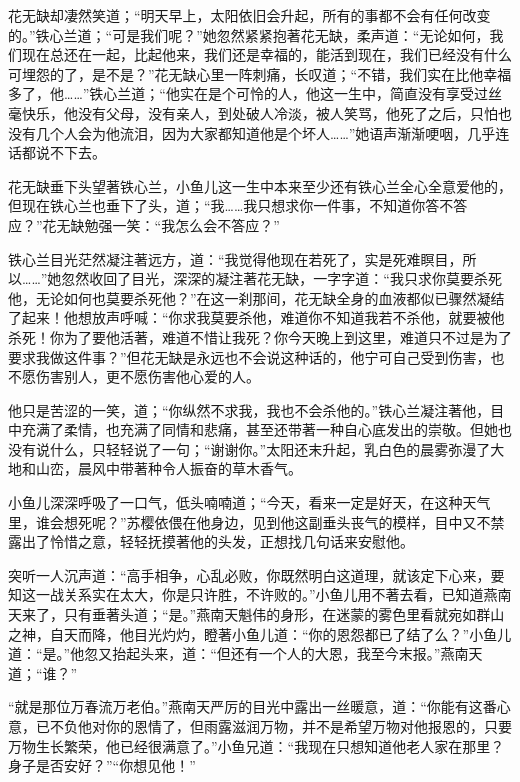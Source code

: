 \documentclass[12pt,oneside]{book}
\begin{document}
花无缺却凄然笑道；``明天早上，太阳依旧会升起，所有的事都不会有任何改变的。''铁心兰道；``可是我们呢？''她忽然紧紧抱著花无缺，柔声道：``无论如何，我们现在总还在一起，比起他来，我们还是幸福的，能活到现在，我们已经没有什么可埋怨的了，是不是？''花无缺心里一阵刺痛，长叹道；``不错，我们实在比他幸福多了，他\ldots\ldots{}''铁心兰道；``他实在是个可怜的人，他这一生中，简直没有享受过丝毫快乐，他没有父母，没有亲人，到处破人冷淡，被人笑骂，他死了之后，只怕也没有几个人会为他流泪，因为大家都知道他是个坏人\ldots\ldots{}''她语声渐渐哽咽，几乎连话都说不下去。

花无缺垂下头望著铁心兰，小鱼儿这一生中本来至少还有铁心兰全心全意爱他的，但现在铁心兰也垂下了头，道；``我\ldots\ldots 我只想求你一件事，不知道你答不答应？''花无缺勉强一笑：``我怎么会不答应？''

铁心兰目光茫然凝注著远方，道：``我觉得他现在若死了，实是死难瞑目，所以\ldots\ldots{}''她忽然收回了目光，深深的凝注著花无缺，一字字道：``我只求你莫要杀死他，无论如何也莫要杀死他？''在这一刹那间，花无缺全身的血液都似已骤然凝结了起来！他想放声呼喊：``你求我莫要杀他，难道你不知道我若不杀他，就要被他杀死！你为了要他活著，难道不惜让我死？你今天晚上到这里，难道只不过是为了要求我做这件事？''但花无缺是永远也不会说这种话的，他宁可自己受到伤害，也不愿伤害别人，更不愿伤害他心爱的人。

他只是苦涩的一笑，道；``你纵然不求我，我也不会杀他的。''铁心兰凝注著他，目中充满了柔情，也充满了同情和悲痛，甚至还带著一种自心底发出的崇敬。但她也没有说什么，只轻轻说了一句；``谢谢你。''太阳还末升起，乳白色的晨雾弥漫了大地和山峦，晨风中带著种令人振奋的草木香气。

小鱼儿深深呼吸了一口气，低头喃喃道；``今天，看来一定是好天，在这种天气里，谁会想死呢？''苏樱依偎在他身边，见到他这副垂头丧气的模样，目中又不禁露出了怜惜之意，轻轻抚摸著他的头发，正想找几句话来安慰他。

突听一人沉声道：``高手相争，心乱必败，你既然明白这道理，就该定下心来，要知这一战关系实在太大，你是只许胜，不许败的。''小鱼儿用不著去看，已知道燕南天来了，只有垂著头道；``是。''燕南天魁伟的身形，在迷蒙的雾色里看就宛如群山之神，自天而降，他目光灼灼，瞪著小鱼儿道：``你的恩怨都已了结了么？''小鱼儿道：``是。''他忽又抬起头来，道：``但还有一个人的大恩，我至今末报。''燕南天道；``谁？''

``就是那位万春流万老伯。''燕南天严厉的目光中露出一丝暖意，道：``你能有这番心意，已不负他对你的恩情了，但雨露滋润万物，并不是希望万物对他报恩的，只要万物生长繁荣，他已经很满意了。''小鱼兄道：``我现在只想知道他老人家在那里？身子是否安好？''``你想见他！''
\end{document}
